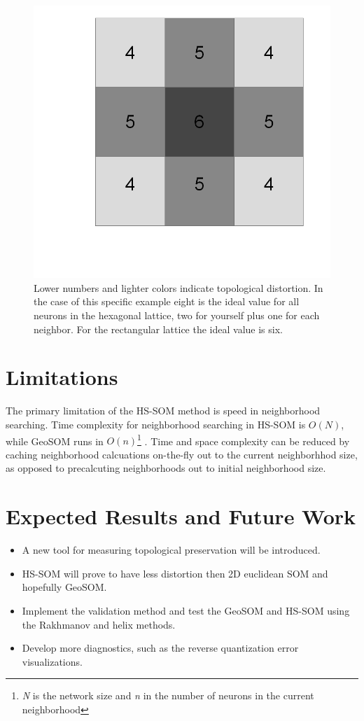 \documentclass[11pt]{article}
\begin{document}
\begin{figure}
\centering
\includegraphics[width=0.4\linewidth]{figure_rect.png}
\caption{Lower numbers and lighter colors indicate topological distortion.  In
the case of this specific example eight is the ideal value for all neurons in
the hexagonal lattice, two for yourself plus one for each neighbor.  For the
rectangular lattice the ideal value is six.}
\label{figure3}
\end{figure}

\section{Limitations}
The primary limitation of the HS-SOM method is speed in neighborhood
searching. Time complexity for neighborhood searching in HS-SOM is
\begin{math}O(N)\end{math}, while GeoSOM runs in
\begin{math}O(n)\end{math}\footnote{\textit{N} is the network size and
\textit{n} in the number of neurons in the current
neighborhood} \citep{Wu:2006lr}. Time and space complexity can be reduced by
caching neighborhood calcuations on-the-fly out to the current neighborhhod
size, as opposed to precalcuting neighborhoods out to initial neighborhood
size.
\section{Expected Results and Future Work}
\begin{itemize}
\item A new tool for measuring topological preservation will be introduced.
\item HS-SOM will prove to have less distortion then 2D euclidean SOM and hopefully GeoSOM.
\item Implement the validation method and test the GeoSOM and HS-SOM using the Rakhmanov and helix methods.
\item Develop more diagnostics, such as the reverse quantization error visualizations.
\end{itemize}





\end{document}
